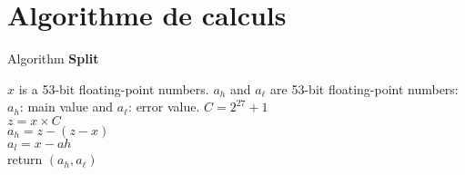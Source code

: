 \section{Algorithme de calculs}

\begin{algorithm}[htbp]
  \caption{Algorithm \textbf{Split}}
\begin{algorithmic}[1]
\Input $x$ is a 53-bit floating-point numbers.
\Output  $a_h$ and $a_{\ell}$ are 53-bit floating-point numbers: $a_h$: main value and $a_{\ell}$: error value.
\State $C = 2^{27}+1$\\
 $z = x\times C$\\
 $a_h = z -(z-x)$\\
 $a_l = x - ah$\\
 return $(a_h,a_{\ell})$
\end{algorithmic}
\end{algorithm}